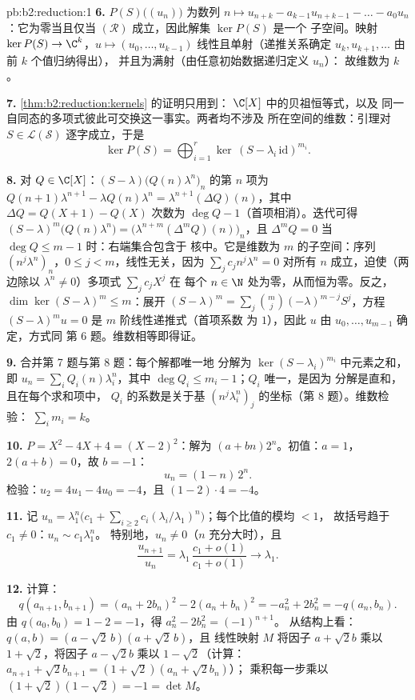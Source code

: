 \begin{solution}{pb:b2:reduction:1}
\textbf{6.} $P(S)\bigl((u_n)\bigr)$ 为数列 $n \mapsto
u_{n+k} - a_{k-1}u_{n+k-1} - \dots - a_0u_n$：它为零当且仅当
$(\mathcal R)$ 成立，因此解集 $\ker P(S)$ 是一个
子空间。映射 $\ker P(S) \to \C^k$，$u \mapsto (u_0, \dots,
u_{k-1})$ 线性且单射（递推关系确定
$u_{k}, u_{k+1}, \dots$ 由前 $k$ 个值归纳得出），
并且为满射（由任意初始数据递归定义 $u_n$）：
故维数为 $k$。

\textbf{7.} \cref{thm:b2:reduction:kernels} 的证明只用到：
$\C[X]$ 中的贝祖恒等式，以及
同一自同态的多项式彼此可交换这一事实。两者均不涉及
所在空间的维数：引理对
$S \in \mathcal{L}(\mathcal{S})$ 逐字成立，于是
\[
\ker P(S) = \bigoplus_{i=1}^{r}
\ker\,(S - \lambda_i\,\mathrm{id})^{m_i}.
\]

\textbf{8.} 对 $Q \in \C[X]$：$(S -
\lambda)\bigl(Q(n)\lambda^n\bigr)_n$ 的第 $n$ 项为
$Q(n{+}1)\lambda^{n+1} - \lambda Q(n)\lambda^n =
\lambda^{n+1}(\Delta Q)(n)$，其中 $\Delta Q = Q(X{+}1) - Q(X)$
次数为 $\deg Q - 1$（首项相消）。迭代可得
$(S - \lambda)^m\bigl(Q(n)\lambda^n\bigr) =
\bigl(\lambda^{n+m}(\Delta^m Q)(n)\bigr)_n$，且 $\Delta^m Q = 0$
当 $\deg Q \leq m - 1$ 时：右端集合包含于
核中。它是维数为 $m$ 的子空间：序列
$(n^j\lambda^n)_n$，$0 \leq j < m$，线性无关，因为
$\sum_j c_j n^j\lambda^n = 0$ 对所有 $n$ 成立，迫使（两边除以
$\lambda^n \neq 0$）多项式 $\sum_j c_jX^j$ 在
每个 $n \in \N$ 处为零，从而恒为零。反之，$\dim\ker(S -
\lambda)^m \leq m$：展开 $(S - \lambda)^m = \sum_j
\binom mj(-\lambda)^{m-j}S^j$，方程 $(S - \lambda)^m u =
0$ 是 $m$ 阶线性递推式（首项系数
为 $1$），因此 $u$ 由 $u_0, \dots, u_{m-1}$ 确定，方式同
第 6 题。维数相等即得证。

\textbf{9.} 合并第 7 题与第 8 题：每个解都唯一地
分解为 $\ker(S -
\lambda_i)^{m_i}$ 中元素之和，即 $u_n = \sum_i Q_i(n)\lambda_i^n$，其中
$\deg Q_i \leq m_i - 1$；$Q_i$ 唯一，是因为
分解是直和，且在每个求和项中，
$Q_i$ 的系数是关于基
$(n^j\lambda_i^n)_j$ 的坐标（第 8 题）。维数检验：
$\sum_i m_i = k$。

\textbf{10.} $P = X^2 - 4X + 4 = (X - 2)^2$：解为 $(a +
bn)2^n$。初值：$a = 1$，$2(a + b) = 0$，故 $b = -1$：
\[
u_n = (1 - n)\,2^n .
\]
检验：$u_2 = 4u_1 - 4u_0 = -4$，且 $(1 - 2)\cdot4 = -4$。

\textbf{11.} 记 $u_n = \lambda_1^n\bigl(c_1 + \sum_{i\geq2}
c_i(\lambda_i/\lambda_1)^n\bigr)$；每个比值的模均 $< 1$，
故括号趋于 $c_1 \neq 0$：$u_n \sim c_1\lambda_1^n$。
特别地，$u_n \neq 0$（$n$ 充分大时），且
\[
\frac{u_{n+1}}{u_n} =
\lambda_1\,\frac{c_1 + o(1)}{c_1 + o(1)} \longrightarrow
\lambda_1 .
\]

\textbf{12.} 计算：
\[
q(a_{n+1}, b_{n+1}) = (a_n + 2b_n)^2 - 2(a_n + b_n)^2
= -a_n^2 + 2b_n^2 = -q(a_n, b_n).
\]
由 $q(a_0, b_0) = 1 - 2 = -1$，得 $a_n^2 - 2b_n^2 = (-1)^{n+1}$。
从结构上看：$q(a, b) = (a - \sqrt2\,b)(a + \sqrt2\,b)$，且
线性映射 $M$ 将因子 $a + \sqrt2 b$ 乘以 $1 +
\sqrt2$，将因子 $a - \sqrt2 b$ 乘以 $1 - \sqrt2$（计算：
$a_{n+1} + \sqrt2 b_{n+1} = (1 + \sqrt2)(a_n + \sqrt2 b_n)$）；
乘积每一步乘以 $(1 + \sqrt2)(1 - \sqrt2) = -1 =
\det M$。


\end{solution}
